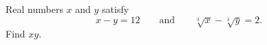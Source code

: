 Real numbers $x$ and $y$ satisfy
\[x-y=12\qquad\text{and}\qquad\sqrt[3]{x}-\sqrt[3]{y}=2.\]
Find $xy$.
